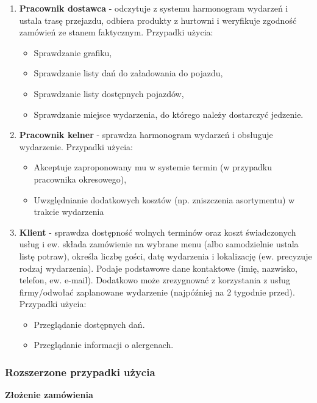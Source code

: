 \documentclass[12pt]{article}
\begin{document}
\begin{enumerate}
    \item \textbf{Pracownik dostawca} - odczytuje z systemu harmonogram wydarzeń i ustala trasę przejazdu, odbiera produkty z hurtowni i weryfikuje zgodność zamówień ze stanem faktycznym. Przypadki użycia:
    \begin{itemize}
        \item Sprawdzanie grafiku,
        \item Sprawdzanie listy dań do załadowania do pojazdu,
        \item Sprawdzanie listy dostępnych pojazdów,
        \item Sprawdzanie miejsce wydarzenia, do którego należy dostarczyć jedzenie.
    \end{itemize}
    
    \item \textbf{Pracownik kelner} - sprawdza harmonogram wydarzeń i obsługuje wydarzenie. Przypadki użycia:
    \begin{itemize}
        \item Akceptuje zaproponowany mu w systemie termin (w przypadku pracownika okresowego),
        \item Uwzględnianie dodatkowych kosztów (np. zniszczenia asortymentu) w trakcie wydarzenia
    \end{itemize}
    
    \item \textbf{Klient} - sprawdza dostępność wolnych terminów oraz koszt świadczonych usług i ew. składa zamówienie na wybrane menu (albo samodzielnie ustala listę potraw), określa liczbę gości, datę wydarzenia i lokalizację (ew. precyzuje rodzaj wydarzenia). Podaje podstawowe dane kontaktowe (imię, nazwisko, telefon, ew. e-mail). Dodatkowo może zrezygnować z korzystania z usług firmy/odwołać zaplanowane wydarzenie (najpóźniej na 2 tygodnie przed). Przypadki użycia:
    \begin{itemize}
        \item Przeglądanie dostępnych dań.
        \item Przeglądanie informacji o alergenach.
    \end{itemize}
\end{enumerate}

\subsubsection{Rozszerzone przypadki użycia}

\noindent\textbf{Złożenie zamówienia}
\end{document}

